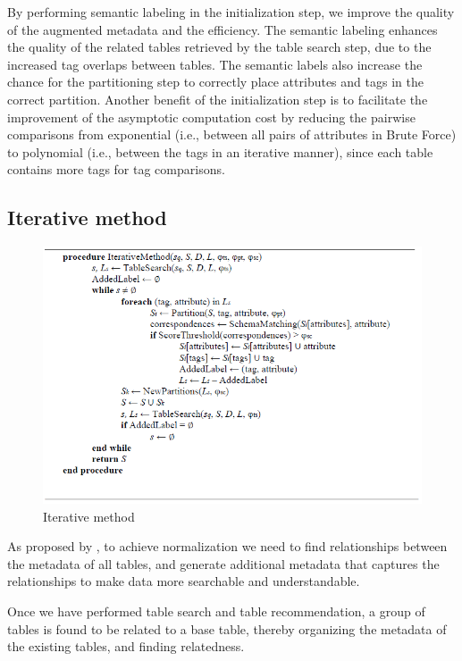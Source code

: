 By performing semantic labeling in the initialization step, we improve the quality of the augmented metadata and the efficiency. The semantic labeling enhances the quality of the related tables retrieved by the table search step, due to the increased tag overlaps between tables. The semantic labels also increase the chance for the partitioning step to correctly place attributes and tags in the correct partition. Another benefit of the initialization step is to facilitate the improvement of the asymptotic computation cost by reducing the pairwise comparisons from exponential (i.e., between all pairs of attributes in Brute Force) to polynomial (i.e., between the tags in an iterative manner), since each table contains more tags for tag comparisons.

\subsection{Iterative method}
\label{ssec:IterativeMethod}

\begin{figure}
  \centering
  \includegraphics[width=5in]{figures/iterative-method.png}
  \caption{Iterative method}
  \label{fig:iterative-method}
\end{figure}

As proposed by \cite{Smith2011Unity}, to achieve normalization we need to find relationships between the metadata of all tables, and generate additional metadata that captures the relationships to make data more searchable and understandable.

Once we have performed table search and table recommendation, a group of tables is found to be related to a base table, thereby organizing the metadata of the existing tables, and finding relatedness.

